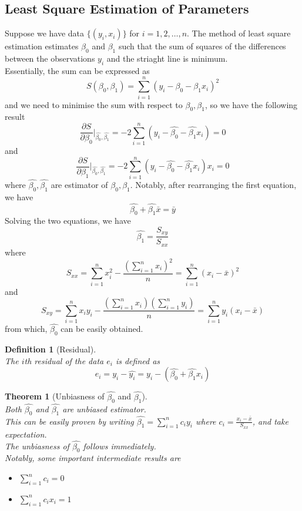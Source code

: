 \documentclass[12pt]{article}
\newtheorem{definition}{Definition}[section]
\newtheorem{theorem}{Theorem}[section]
\theoremstyle{definition}
\begin{document}
\subsection{Least Square Estimation of Parameters}
Suppose we have data $\{(y_i, x_i)\}$ for $i=1, 2, \ldots, n$. The method of least square estimation estimates $\beta_0$ and $\beta_1$ such that the sum of squares of the differences between the observations $y_i$ and the striaght line is minimum.\\
Essentially, the sum can be expressed as 
\[
S(\beta_0, \beta_1) = \sum_{i=1}^n (y_i-\beta_0-\beta_1x_i)^2
\]
and we need to minimise the sum with respect to $\beta_0, \beta_1$, so we have the following result
\[
\frac{\partial S}{\partial \beta_0}\rvert_{\hat{\beta_0}, \hat{\beta_1}} = -2\sum_{i=1}^n(y_i-\hat{\beta_0}-\hat{\beta_1}x_i) = 0
\]
and
\[
\frac{\partial S}{\partial \beta_1}\rvert_{\hat{\beta_0}, \hat{\beta_1}} = -2\sum_{i=1}^n(y_i-\hat{\beta_0}-\hat{\beta_1}x_i)x_i = 0
\]
where $\hat{\beta_0}, \hat{\beta_1}$ are estimator of $\beta_0, \beta_1$.
Notably, after rearranging the first equation, we have
\[
\hat{\beta_0} + \hat{\beta_1}\bar{x} = \bar{y}
\]
Solving the two equations, we have
\[
\hat{\beta_1} = \frac{S_{xy}}{S_{xx}}
\]
where 
\[
S_{xx} = \sum_{i=1}^n x_i^2 - \frac{\left(\sum_{i=1}^n x_i\right)^2}{n} = \sum_{i=1}^n (x_i-\bar{x})^2
\]
and 
\[
S_{xy} = \sum_{i=1}^n x_iy_i - \frac{\left(\sum_{i=1}^n x_i\right)\left(\sum_{i=1}^n y_i\right)}{n} = \sum_{i=1}^n y_i(x_i-\bar{x})
\]
from which, $\hat{\beta_0}$ can be easily obtained.\\
\begin{definition}[Residual]
\hfill\\\normalfont The $i$th residual of the data $e_i$ is defined as
\[
e_i = y_i-\hat{y_i} = y_i-(\hat{\beta_0}+\hat{\beta_1}x_i)
\]
\end{definition}
\begin{theorem}[Unbiasness of {$\hat{\beta_0}$} and {$\hat{\beta_1}$}]
\hfill\\\normalfont Both $\hat{\beta_0}$ and $\hat{\beta_1}$ are unbiased estimator.\\
This can be easily proven by writing $\hat{\beta_1} = \sum_{i=1}^n c_iy_i$ where $c_i=\frac{x_i-\bar{x}}{S_{xx}}$, and take expectation.\\
The unbiasness of $\hat{\beta_0}$ follows immediately.\\
Notably, some important intermediate results are
\begin{itemize}
  \item $\sum_{i=1}^n c_i = 0$
  \item $\sum_{i=1}^n c_ix_i = 1$
\end{itemize}
\end{theorem}
\end{document}
